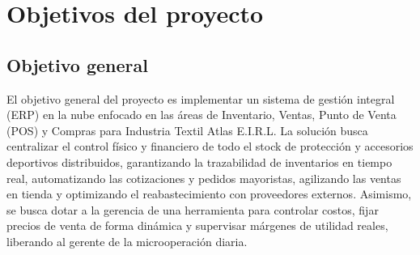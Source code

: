 \section{Objetivos del proyecto}

\subsection{Objetivo general}
\begin{indentedsubsection}
El objetivo general del proyecto es implementar un sistema de gestión integral (ERP) en la nube enfocado en las áreas de Inventario, Ventas, Punto de Venta (POS) y Compras para Industria Textil Atlas E.I.R.L. La solución busca centralizar el control físico y financiero de todo el stock de protección y accesorios deportivos distribuidos, garantizando la trazabilidad de inventarios en tiempo real, automatizando las cotizaciones y pedidos mayoristas, agilizando las ventas en tienda y optimizando el reabastecimiento con proveedores externos. Asimismo, se busca dotar a la gerencia de una herramienta para controlar costos, fijar precios de venta de forma dinámica y supervisar márgenes de utilidad reales, liberando al gerente de la microoperación diaria.
\end{indentedsubsection}

